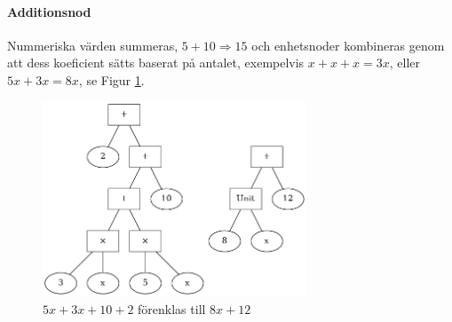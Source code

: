 \documentclass[12pt,a4paper]{article}
\begin{document}
\paragraph{Additionsnod}
Nummeriska värden summeras, \(5 + 10 \Rightarrow 15\) och enhetsnoder kombineras genom att dess koeficient sätts baserat på antalet, exempelvis \(x + x + x = 3x\), eller \(5x + 3x = 8x\), se Figur \ref{fig:2321}.
\begin{figure}[h!]
  \centering
  \includegraphics[width=0.7\textwidth]{image-merged2}
  \caption{\(5x + 3x + 10 + 2\) förenklas till \(8x + 12\)}
  \label{fig:2321}
\end{figure}
\end{document}

